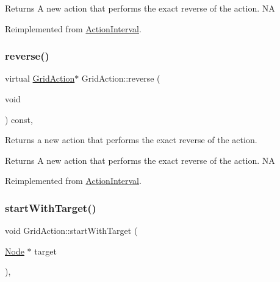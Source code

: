 \begin{DoxyReturn}{Returns}
A new action that performs the exact reverse of the action.  NA 
\end{DoxyReturn}


Reimplemented from \hyperlink{classActionInterval_a9f9ac7164036a0bc261a72f62a2b2da7}{Action\+Interval}.

\mbox{\label{classGridAction_a8f8923dee278b81fdc37bf826ee1d469}} 
\subsubsection{\texorpdfstring{reverse()}{reverse()}\hspace{0.1cm}{\footnotesize\ttfamily [2/2]}}
{\footnotesize\ttfamily virtual \hyperlink{classGridAction}{Grid\+Action}$\ast$ Grid\+Action\+::reverse (\begin{DoxyParamCaption}\item[{void}]{ }\end{DoxyParamCaption}) const\hspace{0.3cm}{\ttfamily [override]}, {\ttfamily [virtual]}}

Returns a new action that performs the exact reverse of the action.

\begin{DoxyReturn}{Returns}
A new action that performs the exact reverse of the action.  NA 
\end{DoxyReturn}


Reimplemented from \hyperlink{classActionInterval_a9f9ac7164036a0bc261a72f62a2b2da7}{Action\+Interval}.

\mbox{\label{classGridAction_a33e2c1bc95bbcf6b16428097b4fd4b61}} 
\subsubsection{\texorpdfstring{start\+With\+Target()}{startWithTarget()}\hspace{0.1cm}{\footnotesize\ttfamily [1/2]}}
{\footnotesize\ttfamily void Grid\+Action\+::start\+With\+Target (\begin{DoxyParamCaption}\item[{\hyperlink{classNode}{Node} $\ast$}]{target }\end{DoxyParamCaption})\hspace{0.3cm}{\ttfamily [override]}, {\ttfamily [virtual]}}

